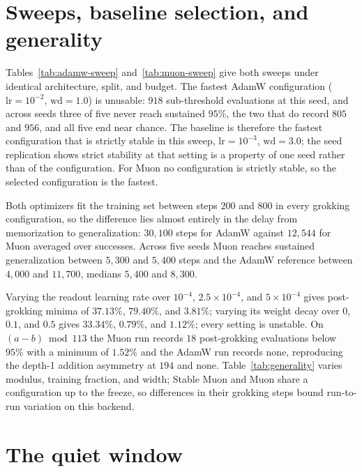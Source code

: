 

\section{Sweeps, baseline selection, and generality}
\label{app:sweeps}





Tables~\ref{tab:adamw-sweep} and~\ref{tab:muon-sweep} give both sweeps under identical architecture, split, and budget. The fastest AdamW configuration ($\mathrm{lr}=10^{-2}$, $\mathrm{wd}=1.0$) is unusable: $918$ sub-threshold evaluations at this seed, and across seeds three of five never reach sustained $95\%$, the two that do record $805$ and $956$, and all five end near chance. The baseline is therefore the fastest configuration that is strictly stable in this sweep, $\mathrm{lr}=10^{-3}$, $\mathrm{wd}=3.0$; the seed replication shows strict stability at that setting is a property of one seed rather than of the configuration. For Muon no configuration is strictly stable, so the selected configuration is the fastest.

Both optimizers fit the training set between steps $200$ and $800$ in every grokking configuration, so the difference lies almost entirely in the delay from memorization to generalization: $30{,}100$ steps for AdamW against $12{,}544$ for Muon averaged over successes. Across five seeds Muon reaches sustained generalization between $5{,}300$ and $5{,}400$ steps and the AdamW reference between $4{,}000$ and $11{,}700$, medians $5{,}400$ and $8{,}300$.

Varying the readout learning rate over $10^{-4}$, $2.5\times10^{-4}$, and $5\times10^{-4}$ gives post-grokking minima of $37.13\%$, $79.40\%$, and $3.81\%$; varying its weight decay over $0$, $0.1$, and $0.5$ gives $33.34\%$, $0.79\%$, and $1.12\%$; every setting is unstable. On $(a-b)\bmod 113$ the Muon run records $18$ post-grokking evaluations below $95\%$ with a minimum of $1.52\%$ and the AdamW run records none, reproducing the depth-1 addition asymmetry at $194$ and none. Table~\ref{tab:generality} varies modulus, training fraction, and width; Stable Muon and Muon share a configuration up to the freeze, so differences in their grokking steps bound run-to-run variation on this backend.

\section{The quiet window}
\label{app:quiet}

